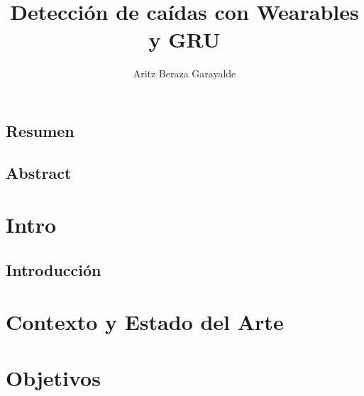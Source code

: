 \documentclass[11pt,a4paper,spanish]{book}
\title{Detección de caídas con Wearables y GRU}
\author{Aritz Beraza Garayalde}
\date{\currenttime}
\begin{document}
\renewcommand{\listfigurename}{Índice de Ilustraciones}
\renewcommand{\listtablename}{Índice de Tablas}
\renewcommand{\contentsname}{Índice de Contenidos}
\renewcommand{\figurename}{Figura}
\renewcommand{\tablename}{Tabla}

\maketitle
\frontmatter
\tableofcontents
\listoffigures
\listoftables

\mainmatter

\section*{Resumen}


\section*{Abstract}



\chapter{Intro}
\section{Introducción}


\chapter{Contexto y Estado del Arte}


\chapter{Objetivos}

\end{document}
